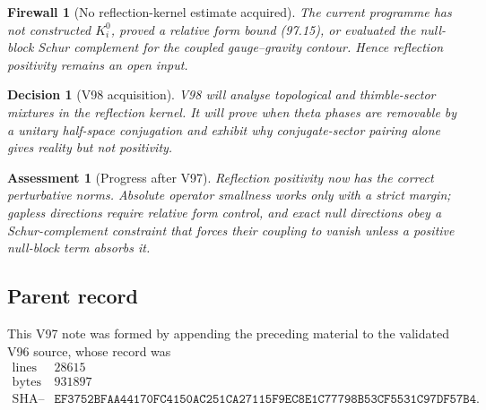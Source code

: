 \documentclass[11pt]{article}
\newtheorem{assessment}[theorem]{Assessment}
\newtheorem{firewall}[theorem]{Firewall}
\newtheorem{decision}[theorem]{Decision}
\begin{document}
\begin{firewall}[No reflection-kernel estimate acquired]
\label{fire:v11v97-boundary}
The current programme has not constructed \(K_i^0\), proved a
relative form bound (97.15), or evaluated the null-block Schur
complement for the coupled gauge--gravity contour.  Hence reflection
positivity remains an open input.
\end{firewall}

\begin{decision}[V98 acquisition]
\label{dec:v11v97-next}
V98 will analyse topological and thimble-sector mixtures in the
reflection kernel.  It will prove when theta phases are removable by
a unitary half-space conjugation and exhibit why conjugate-sector
pairing alone gives reality but not positivity.
\end{decision}

\begin{assessment}[Progress after V97]
\label{ass:v11v97-status}
Reflection positivity now has the correct perturbative norms.
Absolute operator smallness works only with a strict margin;
gapless directions require relative form control, and exact null
directions obey a Schur-complement constraint that forces their
coupling to vanish unless a positive null-block term absorbs it.
\end{assessment}

\subsection{Parent record}

This V97 note was formed by appending the preceding material to the
validated V96 source, whose record was
\[
\begin{array}{c|c}
\text{lines}&28615\\
\text{bytes}&931897\\
\text{SHA--256}&
\texttt{EF3752BFAA44170FC4150AC251CA27115F9EC8E1C77798B53CF5531C97DF57B4}.
\end{array}                                                     \tag{97.19}
\]

\end{document}
